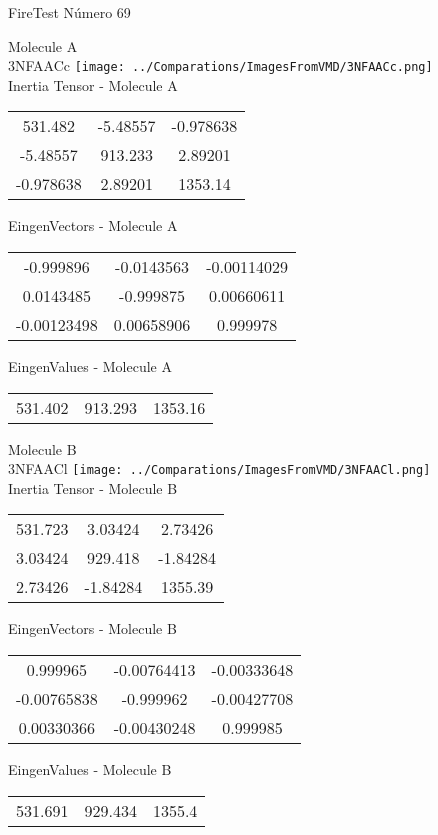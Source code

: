 \vtab[-2cm]
\begin{center}
{\large FireTest \tab Número 69}
\end{center}
\begin{multicols}{2}
\begin{center}

Molecule A \\ 
3NFAACc
\texttt{[image: ../Comparations/ImagesFromVMD/3NFAACc.png]}
\\
Inertia Tensor - Molecule A \\
\vtab

\begin{tabular}{|c c c|}
531.482	 & 	-5.48557	 & 	-0.978638	 \\
-5.48557	 & 	913.233	 & 	2.89201	 \\
-0.978638	 & 	2.89201	 & 	1353.14
\end{tabular}

\vtab
 EingenVectors - Molecule A     \\
\vtab
\begin{tabular}{|c c c|}
-0.999896	 & 	-0.0143563	 & 	-0.00114029	 \\
0.0143485	 & 	-0.999875	 & 	0.00660611	 \\
-0.00123498	 & 	0.00658906	 & 	0.999978
\end{tabular}

\vtab
 EingenValues - Molecule A     \\
\vtab
\begin{tabular}{|c c c|}
531.402	 & 	913.293	 & 	1353.16	 \\
\end{tabular}
\columnbreak

Molecule B \\ 
3NFAACl
\texttt{[image: ../Comparations/ImagesFromVMD/3NFAACl.png]}
\\
Inertia Tensor - Molecule B \\
\vtab

\begin{tabular}{|c c c|}
531.723	 & 	3.03424	 & 	2.73426	 \\
3.03424	 & 	929.418	 & 	-1.84284	 \\
2.73426	 & 	-1.84284	 & 	1355.39
\end{tabular}

\vtab
 EingenVectors - Molecule B     \\
\vtab
\begin{tabular}{|c c c|}
0.999965	 & 	-0.00764413	 & 	-0.00333648	 \\
-0.00765838	 & 	-0.999962	 & 	-0.00427708	 \\
0.00330366	 & 	-0.00430248	 & 	0.999985
\end{tabular}

\vtab
 EingenValues - Molecule B     \\
\vtab
\begin{tabular}{|c c c|}
531.691	 & 	929.434	 & 	1355.4	 \\
\end{tabular}

\end{center}
\end{multicols}
